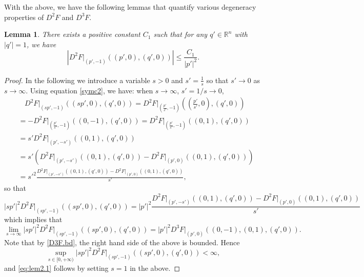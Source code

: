\documentclass[12pt]{article}
\numberwithin{equation}{section}
\theoremstyle{plain}
\newtheorem{lemma}[theorem]{Lemma}
\theoremstyle{definition}
\theoremstyle{remark}
\begin{document}
With the above,  we have the following lemmas that quantify various degeneracy properties of $D^2 F$ and $D^3F$.
\begin{lemma} \label{lem:2.1}
    There exists a positive constant $C_1$ such that for any $q'\in \mathbb{R}^n$ with $|q'|=1$, we have
\begin{equation}\label{eq:lem2.1}
    \left|D^2 F\Big|_{(p',-1)} ((p',0), (q',0))\right| \leq \frac{C_1}{|p'|^2}.
\end{equation}
\end{lemma}
\begin{proof}
In the following we introduce a variable $s>0$ and $s'=\frac{1}{s}$ so that $s'\longrightarrow0$ as $s\longrightarrow\infty$.
Using equation \eqref{symc2}, we have: when $s\rightarrow \infty$, $s'=1/s\rightarrow 0$,
\begin{equation*}
\begin{split}
    & \ \ \ \  D^2 F\Big|_{(sp',-1)} ((sp',0), (q',0))  = D^2 F\Big|_{(\frac{p'}{s'},-1)} ((\frac{p'}{s'},0), (q',0)) \\
    & = - D^2 F\Big|_{(\frac{p'}{s'},-1)} ((0,-1), (q',0) ) = D^2 F\Big|_{(\frac{p'}{s'},-1)} ((0,1), (q',0) ) \\
    & = s' D^2 F\Big|_{(p',-s')} ((0,1), (q',0) ) \\
    & = s' \left( D^2 F\Big|_{(p',-s')} ((0,1), (q',0) ) - D^2 F\Big|_{(p',0)} ((0,1),(q',0))   \right) \\
    & = s'^2 \frac{D^2 F\Big|_{(p',-s')} ((0,1), (q',0) ) - D^2 F\Big|_{(p',0)} ((0,1),(q',0))}{s'}, 
\end{split}
\end{equation*}
so that 
\[
|sp'|^2D^2 F\Big|_{(sp',-1)} ((sp',0), (q',0))
=
|p'|^2 \frac{D^2 F\Big|_{(p',-s')} ((0,1), (q',0) ) - D^2 F\Big|_{(p',0)} ((0,1),(q',0))}{s'}
\]
which implies that
\begin{equation*}
    \lim_{s\rightarrow \infty} |sp'|^2 D^2 F\Big|_{(sp',-1)} ((sp',0), (q',0)) = |p'|^2 D^3 F\Big|_{(p',0)} ((0,-1), (0,1),(q',0)). 
\end{equation*}
Note that by \eqref{D3F.bd}, the right hand side of the above is bounded. Hence
\begin{equation*}
    \sup_{s\in[0,+\infty)} |sp'|^2 D^2 F\Big|_{(sp',-1)} ((sp',0), (q',0)) <
    \infty,
\end{equation*}
and \eqref{eq:lem2.1} follows by setting $s=1$ in the above.
\end{proof}
\end{document}
